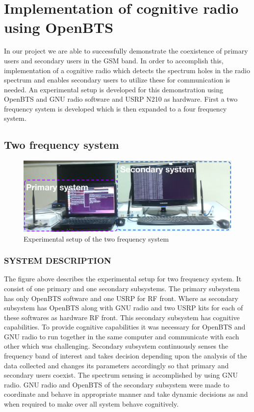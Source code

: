 \chapter{Implementation of cognitive radio using OpenBTS}

In our project we are able to successfully demonstrate the coexistence of 
primary users and secondary users in the GSM band. In order to accomplish this, 
implementation of a cognitive radio which detects the spectrum holes in the 
radio spectrum and enables secondary users to utilize these for communication 
is needed. An experimental setup is developed for this demonstration using 
OpenBTS and GNU radio software and USRP N210 as hardware. First a two frequency 
system is developed which is then expanded to a four frequency system.


\section{Two frequency system}

\begin{figure}
\centering
\includegraphics[width=1\textwidth]{freq2}
\caption[Experimental setup, 2-frequency system]{Experimental setup of the two
 frequency system}
\label{freq2}
\end{figure}


\subsection{SYSTEM DESCRIPTION}
The figure above describes the experimental setup for two frequency system. It 
consist of one primary and one secondary subsystems. The primary subsystem has 
only OpenBTS software and one USRP for RF front. Where as secondary subsystem 
has OpenBTS along with GNU radio and two USRP kits for each of these softwares 
as hardware RF front. This secondary subsystem has cognitive capabilities. To 
provide cognitive capabilities it was necessary for OpenBTS and GNU radio to run 
together in the same computer and communicate with each other which was challenging. 
Secondary subsystem continuously senses the frequency band of interest and  
takes decision depending upon the analysis of the data collected and changes 
its parameters accordingly so that primary and secondary users coexist. The 
spectrum sensing is accomplished by using GNU radio.  GNU radio and 
OpenBTS of the secondary subsystem were made to coordinate and behave in appropriate manner and take dynamic decisions 
as and when required to make over all system behave cognitively.

